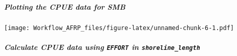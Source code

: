\documentclass[
]{article}
\newenvironment{Shaded}{\begin{snugshade}}{\end{snugshade}}
\newcommand{\DataTypeTok}[1]{\textcolor[rgb]{0.13,0.29,0.53}{#1}}
\newcommand{\DecValTok}[1]{\textcolor[rgb]{0.00,0.00,0.81}{#1}}
\newcommand{\FloatTok}[1]{\textcolor[rgb]{0.00,0.00,0.81}{#1}}
\newcommand{\KeywordTok}[1]{\textcolor[rgb]{0.13,0.29,0.53}{\textbf{#1}}}
\newcommand{\NormalTok}[1]{#1}
\newcommand{\OperatorTok}[1]{\textcolor[rgb]{0.81,0.36,0.00}{\textbf{#1}}}
\newcommand{\StringTok}[1]{\textcolor[rgb]{0.31,0.60,0.02}{#1}}
\begin{document}
\hypertarget{plotting-the-cpue-data-for-smb}{%
\subparagraph{Plotting the CPUE data for
SMB}\label{plotting-the-cpue-data-for-smb}}

\begin{Shaded}
\end{Shaded}

\texttt{[image: Workflow\_AFRP\_files/figure-latex/unnamed-chunk-6-1.pdf]}

\hypertarget{calculate-cpue-data-using-effort-in-shoreline_length}{%
\subparagraph{\texorpdfstring{Calculate CPUE data using \texttt{EFFORT}
in
\texttt{shoreline\_length}}{Calculate CPUE data using EFFORT in shoreline\_length}}\label{calculate-cpue-data-using-effort-in-shoreline_length}}
\end{document}
